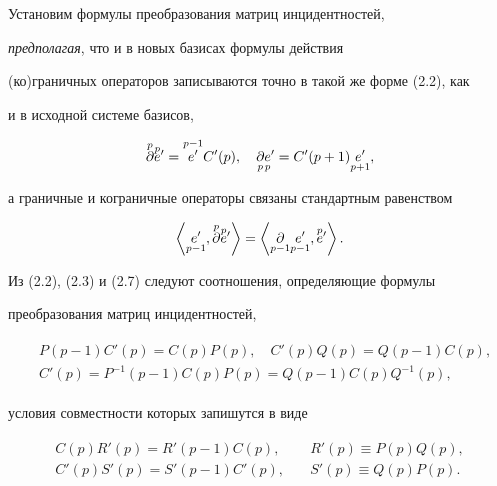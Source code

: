  


Установим формулы преобразования матриц инцидентностей, 


{\em предполагая}, что и в новых базисах формулы действия 


(ко)граничных операторов записываются точно в такой же форме (2.2), как 


и в исходной системе базисов, 


\begin{equation} 


\up{p}{\partial}\up{p}{e}'=\up{p-1}{e'}C'(p),\quad 


\down{p}{\partial}\down{p}{e}'=C'(p+1)\down{p+1}{e'}, 


\end{equation} 


а граничные и кограничные операторы связаны стандартным равенством 


\begin{equation} 


\left\langle\down{p-1}{e'},\up{p}{\partial}\up{p}{e}' 


\right\rangle= 


\left\langle\down{p-1}{\partial}\down{p-1}{e'},\up{p}{e}' 


\right\rangle. 


\end{equation} 


Из (2.2), (2.3) и (2.7) следуют соотношения, определяющие формулы 


преобразования матриц инцидентностей, 


\begin{gather} 


\begin{split} 


&P(p-1)C'(p)=C(p)P(p),\quad 


C'(p)Q(p)=Q(p-1)C(p),\\ 


&C'(p)=P^{-1}(p-1)C(p)P(p)=Q(p-1)C(p)Q^{-1}(p), 


\end{split} 


\end{gather} 


условия совместности которых запишутся в виде 


\begin{gather}


\begin{split} 


C(p)R'(p)=R'(p-1)C(p),&\quad R'(p)\equiv P(p)Q(p),\\ 


C'(p)S'(p)=S'(p-1)C'(p),&\quad S'(p)\equiv Q(p)P(p). 


\end{split} 


\end{gather} 


